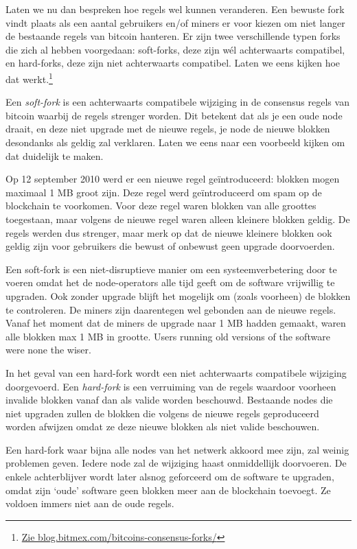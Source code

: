 \documentclass[
  letterpaper,
]{scrbook}
\begin{document}
Laten we nu dan bespreken hoe regels wel kunnen veranderen. Een bewuste
fork vindt plaats als een aantal gebruikers en/of miners er voor kiezen
om niet langer de bestaande regels van bitcoin hanteren. Er zijn twee
verschillende typen forks die zich al hebben voorgedaan: soft-forks,
deze zijn wél achterwaarts compatibel, en hard-forks, deze zijn niet
achterwaarts compatibel. Laten we eens kijken hoe dat werkt.\footnote{\href{https://blog.bitmex.com/bitcoins-consensus-forks/}{Zie
  blog.bitmex.com/bitcoins-consensus-forks/}}

Een \emph{soft-fork} is een achterwaarts compatibele wijziging in de
consensus regels van bitcoin waarbij de regels strenger worden. Dit
betekent dat als je een oude node draait, en deze niet upgrade met de
nieuwe regels, je node de nieuwe blokken desondanks als geldig zal
verklaren. Laten we eens naar een voorbeeld kijken om dat duidelijk te
maken.

Op 12 september 2010 werd er een nieuwe regel geïntroduceerd: blokken
mogen maximaal 1 MB groot zijn. Deze regel werd geïntroduceerd om spam
op de blockchain te voorkomen. Voor deze regel waren blokken van alle
groottes toegestaan, maar volgens de nieuwe regel waren alleen kleinere
blokken geldig. De regels werden dus strenger, maar merk op dat de
nieuwe kleinere blokken ook geldig zijn voor gebruikers die bewust of
onbewust geen upgrade doorvoerden.

Een soft-fork is een niet-disruptieve manier om een systeemverbetering
door te voeren omdat het de node-operators alle tijd geeft om de
software vrijwillig te upgraden. Ook zonder upgrade blijft het mogelijk
om (zoals voorheen) de blokken te controleren. De miners zijn
daarentegen wel gebonden aan de nieuwe regels. Vanaf het moment dat de
miners de upgrade naar 1 MB hadden gemaakt, waren alle blokken max 1 MB
in grootte. Users running old versions of the software were none the
wiser.

In het geval van een hard-fork wordt een niet achterwaarts compatibele
wijziging doorgevoerd. Een \emph{hard-fork} is een verruiming van de
regels waardoor voorheen invalide blokken vanaf dan als valide worden
beschouwd. Bestaande nodes die niet upgraden zullen de blokken die
volgens de nieuwe regels geproduceerd worden afwijzen omdat ze deze
nieuwe blokken als niet valide beschouwen.

Een hard-fork waar bijna alle nodes van het netwerk akkoord mee zijn,
zal weinig problemen geven. Iedere node zal de wijziging haast
onmiddellijk doorvoeren. De enkele achterblijver wordt later alsnog
geforceerd om de software te upgraden, omdat zijn `oude' software geen
blokken meer aan de blockchain toevoegt. Ze voldoen immers niet aan de
oude regels.
\end{document}
